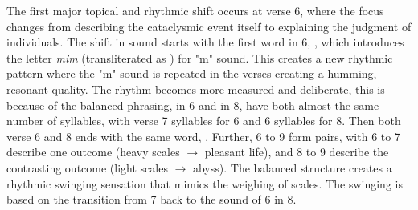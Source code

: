 The first major topical and rhythmic shift occurs at verse 6, where the focus changes from describing the cataclysmic event itself to explaining the judgment of individuals. The shift in sound starts with the first word in   6,  , which introduces the letter \textit{mim}  (transliterated as ) for "m" sound. This creates a new rhythmic pattern where the "m" sound is repeated in the verses creating a humming, resonant quality. The rhythm becomes more measured and deliberate, this is because of the balanced phrasing,   in   6 and    in   8, have both almost the same number of syllables, with verse 7 syllables for   6 and 6 syllables for   8. Then both verse 6 and 8 ends with the same word,  . Further,   6 to 9 form pairs, with   6 to 7 describe one outcome (heavy scales $\rightarrow$ pleasant life), and   8 to 9 describe the contrasting outcome (light scales $\rightarrow$ abyss). The balanced structure creates a rhythmic swinging sensation that mimics the weighing of scales. The swinging is based on the transition from   7 back to the sound of   6 in   8. 

